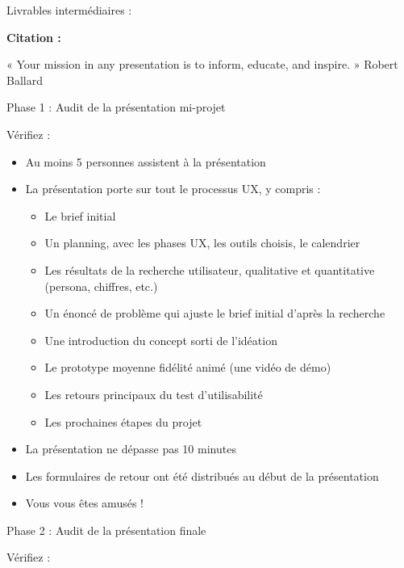 Livrables intermédiaires :

\textbf{Citation :}

« Your mission in any presentation is to inform, educate, and inspire. » Robert Ballard

\medskip

Phase 1 : Audit de la présentation mi-projet

Vérifiez :

\begin{itemize}
\item Au moins 5 personnes assistent à la présentation
\item La présentation porte sur tout le processus UX, y compris :
\begin{itemize}
\item Le brief initial
\item Un planning, avec les phases UX, les outils choisis, le calendrier
\item Les résultats de la recherche utilisateur, qualitative et quantitative (persona, chiffres, etc.)
\item Un énoncé de problème qui ajuste le brief initial d'après la recherche
\item Une introduction du concept sorti de l'idéation
\item Le prototype moyenne fidélité animé (une vidéo de démo)
\item Les retours principaux du test d'utilisabilité
\item Les prochaines étapes du projet
\end{itemize}
\item La présentation ne dépasse pas 10 minutes
\item Les formulaires de retour ont été distribués au début de la présentation
\item Vous vous êtes amusés !
\end{itemize}

\medskip

Phase 2 : Audit de la présentation finale

Vérifiez :

